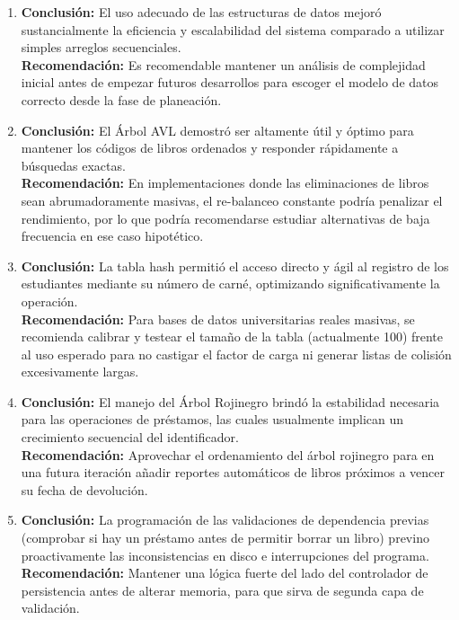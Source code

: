 \documentclass[11pt]{article}
\begin{document}
\begin{enumerate}
    \item \textbf{Conclusión:} El uso adecuado de las estructuras de datos mejoró sustancialmente la eficiencia y escalabilidad del sistema comparado a utilizar simples arreglos secuenciales.\\
    \textbf{Recomendación:} Es recomendable mantener un análisis de complejidad inicial antes de empezar futuros desarrollos para escoger el modelo de datos correcto desde la fase de planeación.

    \item \textbf{Conclusión:} El Árbol AVL demostró ser altamente útil y óptimo para mantener los códigos de libros ordenados y responder rápidamente a búsquedas exactas.\\
    \textbf{Recomendación:} En implementaciones donde las eliminaciones de libros sean abrumadoramente masivas, el re-balanceo constante podría penalizar el rendimiento, por lo que podría recomendarse estudiar alternativas de baja frecuencia en ese caso hipotético.

    \item \textbf{Conclusión:} La tabla hash permitió el acceso directo y ágil al registro de los estudiantes mediante su número de carné, optimizando significativamente la operación.\\
    \textbf{Recomendación:} Para bases de datos universitarias reales masivas, se recomienda calibrar y testear el tamaño de la tabla (actualmente 100) frente al uso esperado para no castigar el factor de carga ni generar listas de colisión excesivamente largas.

    \item \textbf{Conclusión:} El manejo del Árbol Rojinegro brindó la estabilidad necesaria para las operaciones de préstamos, las cuales usualmente implican un crecimiento secuencial del identificador.\\
    \textbf{Recomendación:} Aprovechar el ordenamiento del árbol rojinegro para en una futura iteración añadir reportes automáticos de libros próximos a vencer su fecha de devolución.

    \item \textbf{Conclusión:} La programación de las validaciones de dependencia previas (comprobar si hay un préstamo antes de permitir borrar un libro) previno proactivamente las inconsistencias en disco e interrupciones del programa.\\
    \textbf{Recomendación:} Mantener una lógica fuerte del lado del controlador de persistencia antes de alterar memoria, para que sirva de segunda capa de validación.


\end{enumerate}
\end{document}
